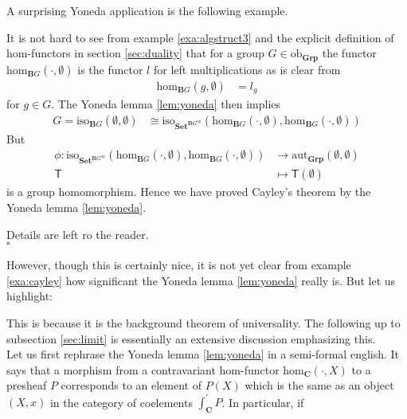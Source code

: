 A surprising Yoneda application is the following example.
\\
\begin{exa}
\label{exa:cayley}
It is not hard to see from example \ref{exa:algstruct3} and the explicit definition of hom-functors in section \ref{sec:duality} that for a group $G \in \mathrm{ob}_{\mathbf{Grp}}$ the functor $\mathrm{hom}_{\mathbf{B}G}(\cdot,\emptyset)$ is the functor $l$ for left multiplications as is clear from
\begin{align*}
  \mathrm{hom}_{\mathbf{B}G}(g,\emptyset)
  &=
  l_{g}
\end{align*}
for $g \in G$. The Yoneda lemma \ref{lem:yoneda} then implies
\begin{align*}
  G
  =
  \mathrm{iso}_{\mathbf{B}G}(\emptyset,\emptyset)
  &\cong
  \mathrm{iso}_{\mathbf{Set}^{\mathbf{B}G^{\mathrm{op}}}}
  \left(
    \mathrm{hom}_{\mathbf{B}G}(\cdot,\emptyset),
    \mathrm{hom}_{\mathbf{B}G}(\cdot,\emptyset)
  \right)
\end{align*}
But
\begin{align*}
  \phi
  \colon
  \mathrm{iso}_{\mathbf{Set}^{\mathbf{B}G^{\mathrm{op}}}}
  \left(
    \mathrm{hom}_{\mathbf{B}G}(\cdot,\emptyset),
    \mathrm{hom}_{\mathbf{B}G}(\cdot,\emptyset)
  \right)
  &\rightarrow
  \mathrm{aut}_{\mathbf{Grp}}(\emptyset,\emptyset)
  \\
  \mathsf{T}
  &\mapsto
  \mathsf{T}(\emptyset)
\end{align*}
is a group homomorphism. Hence we have proved Cayley's theorem by the Yoneda lemma \ref{lem:yoneda}.
\end{exa}
\begin{prf}
Details are left ro the reader.
\\
\phantom{proven}
\hfill
$\square$
\end{prf}
However, though this is certainly nice, it is not yet clear from example \ref{exa:cayley} how significant the Yoneda lemma \ref{lem:yoneda} really is. But let us highlight:
\begin{center}
\end{center}
This is because it is the background theorem of universality. The following up to subsection \ref{sec:limit} is essentially an extensive discussion emphasizing this.
\\
Let us first rephrase the Yoneda lemma \ref{lem:yoneda} in a semi-formal english. It says that a morphism from a contravariant hom-functor $\mathrm{hom}_{\mathbf{C}}(\cdot,X)$ to a presheaf $P$ corresponds to an element of $P(X)$ which is the same as an object $(X,x)$ in the category of coelements $\int_{\mathbf{C}}^{\prime}P$. In particular, if
